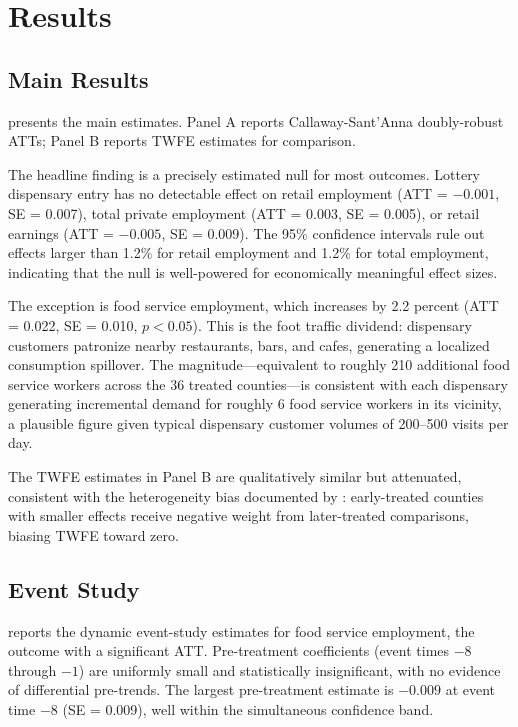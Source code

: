 \documentclass[12pt]{article}
\begin{document}
\section{Results}
\label{sec:results}

\subsection{Main Results}

 presents the main estimates. Panel A reports Callaway-Sant'Anna doubly-robust ATTs; Panel B reports TWFE estimates for comparison.

The headline finding is a precisely estimated null for most outcomes. Lottery dispensary entry has no detectable effect on retail employment (ATT = $-0.001$, SE = 0.007), total private employment (ATT = 0.003, SE = 0.005), or retail earnings (ATT = $-0.005$, SE = 0.009). The 95\% confidence intervals rule out effects larger than 1.2\% for retail employment and 1.2\% for total employment, indicating that the null is well-powered for economically meaningful effect sizes.

The exception is food service employment, which increases by 2.2 percent (ATT = 0.022, SE = 0.010, $p < 0.05$). This is the foot traffic dividend: dispensary customers patronize nearby restaurants, bars, and cafes, generating a localized consumption spillover. The magnitude---equivalent to roughly 210 additional food service workers across the 36 treated counties---is consistent with each dispensary generating incremental demand for roughly 6 food service workers in its vicinity, a plausible figure given typical dispensary customer volumes of 200--500 visits per day.

The TWFE estimates in Panel B are qualitatively similar but attenuated, consistent with the heterogeneity bias documented by \citet{GoodmanBacon2021}: early-treated counties with smaller effects receive negative weight from later-treated comparisons, biasing TWFE toward zero.



\subsection{Event Study}

 reports the dynamic event-study estimates for food service employment, the outcome with a significant ATT. Pre-treatment coefficients (event times $-8$ through $-1$) are uniformly small and statistically insignificant, with no evidence of differential pre-trends. The largest pre-treatment estimate is $-0.009$ at event time $-8$ (SE = 0.009), well within the simultaneous confidence band.
\end{document}
